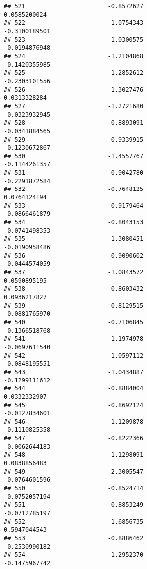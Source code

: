\documentclass[
]{article}
\begin{document}
\begin{verbatim}
## 521                       -0.8572627                          0.0585200024
## 522                       -1.0754343                         -0.3100189501
## 523                       -1.0300575                         -0.0194876948
## 524                       -1.2104868                         -0.1420355985
## 525                       -1.2852612                         -0.2303101556
## 526                       -1.3027476                          0.0313328284
## 527                       -1.2721680                         -0.0323932945
## 528                       -0.8893091                         -0.0341884565
## 529                       -0.9339915                         -0.1230672867
## 530                       -1.4557767                         -0.1144261357
## 531                       -0.9042780                         -0.2291872584
## 532                       -0.7648125                          0.0764124194
## 533                       -0.9179464                         -0.0866461879
## 534                       -0.8043153                         -0.0741498353
## 535                       -1.3080451                         -0.0190958486
## 536                       -0.9090602                         -0.0444574059
## 537                       -1.0843572                          0.0590895195
## 538                       -0.8603432                          0.0936217827
## 539                       -0.8129515                         -0.0881765970
## 540                       -0.7106845                         -0.1366518768
## 541                       -1.1974978                         -0.0697611540
## 542                       -1.0597112                         -0.0848195551
## 543                       -1.0434887                         -0.1299111612
## 544                       -0.8884004                          0.0332332907
## 545                       -0.8692124                         -0.0127834601
## 546                       -1.1209878                         -0.1110825358
## 547                       -0.8222366                         -0.0062644183
## 548                       -1.1298091                          0.0838856483
## 549                       -2.3005547                         -0.0764601596
## 550                       -0.8524714                         -0.0752057194
## 551                       -0.8853249                         -0.0712785197
## 552                       -1.6856735                          0.5947044543
## 553                       -0.8886462                         -0.2530990182
## 554                       -1.2952370                         -0.1475967742

\end{verbatim}
\end{document}
